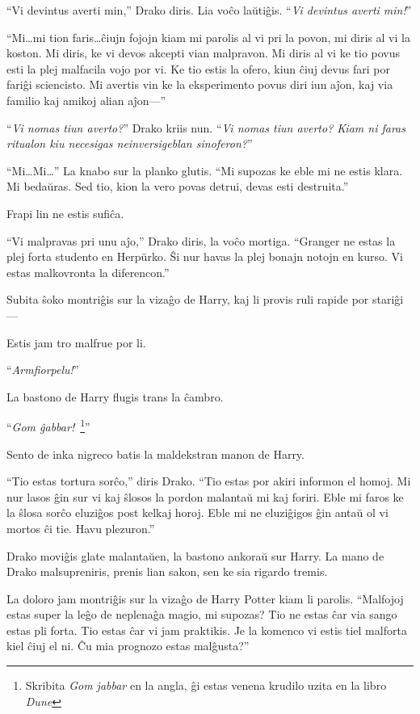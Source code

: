 ``Vi devintus averti min,'' Drako diris. Lia voĉo laŭtiĝis. ``\emph{Vi
  devintus averti min!}''

``Mi\ldots{}mi tion faris\ldots{}ĉiujn fojojn kiam mi parolis al vi
pri la povon, mi diris al vi la koston. Mi diris, ke vi devos akcepti
vian malpravon. Mi diris al vi ke tio povus esti la plej malfacila
vojo por vi. Ke tio estis la ofero, kiun ĉiuj devus fari por fariĝi
sciencisto. Mi avertis vin ke la eksperimento povus diri iun aĵon, kaj
via familio kaj amikoj alian aĵon—''


``\emph{Vi nomas tiun averto?}'' Drako kriis nun. ``\emph{Vi nomas tiun averto? Kiam ni faras ritualon kiu necesigas neinversigeblan sinoferon?}''


``Mi\ldots{}Mi\ldots{}'' La knabo sur la planko glutis. ``Mi supozas
ke eble mi ne estis klara. Mi bedaŭras. Sed tio, kion la vero povas
detrui, devas esti destruita.''

Frapi lin ne estis sufiĉa.

``Vi malpravas pri unu aĵo,'' Drako diris, la voĉo mortiga. ``Granger
ne estas la plej forta studento en Herpŭrko. Ŝi nur havas la plej
bonajn notojn en kurso. Vi estas malkovronta la diferencon.''

Subita ŝoko montriĝis sur la vizaĝo de Harry, kaj li provis ruli
rapide por stariĝi—

Estis jam tro malfrue por li.

``\emph{Armfiorpelu!}''

La bastono de Harry flugis trans la ĉambro.

“\emph{Gom ĝabbar!}~\footnote{Skribita \emph{Gom jabbar} en la angla,
  ĝi estas venena krudilo uzita en la libro \emph{Dune}}”

Sento de inka nigreco batis la maldekstran manon de Harry.

``Tio estas tortura sorĉo,'' diris Drako. ``Tio estas por akiri
informon el homoj. Mi nur lasos ĝin sur vi kaj ŝlosos la pordon
malantaŭ mi kaj foriri. Eble mi faros ke la ŝlosa sorĉo eluziĝos post
kelkaj horoj. Eble mi ne eluziĝigos ĝin antaŭ ol vi mortos ĉi
tie. Havu plezuron.''

Drako moviĝis glate malantaŭen, la bastono ankoraŭ sur Harry. La mano
de Drako malsupreniris, prenis lian sakon, sen ke sia rigardo tremis.

La doloro jam montriĝis sur la vizaĝo de Harry Potter kiam li
parolis. ``Malfojoj estas super la leĝo de neplenaĝa magio, mi
supozas? Tio ne estas ĉar via sango estas pli forta. Tio estas ĉar vi
jam praktikis. Je la komenco vi estis tiel malforta kiel ĉiuj el
ni. Ĉu mia prognozo estas malĝusta?''

